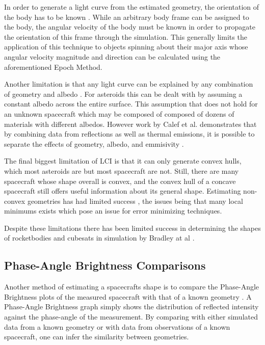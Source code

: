 \documentclass{article}
\begin{document}
In order to generate a light curve from the estimated geometry, the orientation of the body has to be known \cite{PSI}. While an arbitrary body frame can be assigned to the body, the angular velocity of the body must be known in order to propagate the orientation of this frame through the simulation. This generally limits the application of this technique to objects spinning about their major axis \cite{Separating} whose angular velocity magnitude and direction can be calculated using the aforementioned Epoch Method. 

Another limitation is that any light curve can be explained by any combination of geometry and albedo \cite{Magnusson1989DeterminationOP}. For asteroids this can be dealt with by assuming a constant albedo across the entire surface. This assumption that does not hold for an unknown spacecraft which may be composed of composed of dozens of materials with different albedos. However work by Calef et al. demonstrates that by combining data from reflections as well as thermal emissions, it is possible to separate the effects of geometry, albedo, and emmisivity \cite{PSI}. 

The final biggest limitation of LCI is that it can only generate convex hulls, which most asteroids are but most spacecraft are not. Still, there are many spacecraft whose shape overall is convex, and the convex hull of a concave spacecraft still offers useful information about its general shape. Estimating non-convex geometries has had limited success \cite{Kaasalainen}, the issues being that many local minimums exists which pose an issue for error minimizing techniques.

Despite these limitations there has been limited success in determining the shapes of rocketbodies and cubesats in simulation by Bradley at al \cite{Bradley2014LIGHTCURVEIF}.

\subsection{Phase-Angle Brightness Comparisons}

Another method of estimating a spacecrafts shape is to compare the Phase-Angle Brightness plots of the measured spacecraft with that of a known geometry \cite{Separating}. A Phase-Angle Brightness graph simply shows the distribution of reflected intensity against the phase-angle of the measurement. By comparing with either simulated data from a known geometry or with data from observations of a known spacecraft, one can infer the similarity between geometries.
\end{document}

